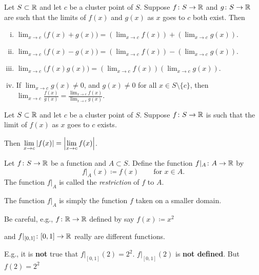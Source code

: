 \documentclass[10pt,aspectratio=169]{beamer}
\begin{document}
\begin{frame}

\begin{corollary}
Let $S \subset {\mathbb{R}}$ and let $c$ be a cluster point of $S$.  
Suppose $f \colon S \to {\mathbb{R}}$ and
$g \colon S \to {\mathbb{R}}$ are 
such that 
the limits of $f(x)$ and $g(x)$ as $x$ goes to $c$ both exist.
\pause
Then
\begin{enumerate}[(i)]
\item
$\displaystyle
\lim_{x\to c} \bigl(f(x)+g(x)\bigr) = \left(\lim_{x\to c} f(x)\right) + 
\left(\lim_{x\to c} g(x)\right) .
$
\item
\pause
$\displaystyle
\lim_{x\to c} \bigl(f(x)-g(x)\bigr) = \left(\lim_{x\to c} f(x)\right) -
\left(\lim_{x\to c} g(x)\right) .
$
\item
\pause
$\displaystyle
\lim_{x\to c} \bigl(f(x)g(x)\bigr) = \left(\lim_{x\to c} f(x)\right)
\left(\lim_{x\to c} g(x)\right) .
$
\item\pause\label{falg:cor:iv}
If
$\displaystyle \lim_{x\to c} g(x) \not= 0$,
and $g(x) \not= 0$ for all $x \in S \setminus \{ c \}$, then
$\displaystyle
\lim_{x\to c} \frac{f(x)}{g(x)} =
\frac{\lim_{x\to c} f(x)}{\lim_{x\to c} g(x)}$.
\end{enumerate}
\end{corollary}

\pause
\begin{corollary}
Let $S \subset {\mathbb{R}}$ and let $c$ be a cluster point of $S$.
Suppose $f \colon S \to {\mathbb{R}}$ is such that the limit of $f(x)$ as $x$ goes to $c$
exists.

\pause
\medskip

Then
\quad
$\displaystyle
\lim_{x\to c} \left\lvert {f(x)} \right\rvert =
\left\lvert {\lim_{x\to c} f(x)} \right\rvert$.
\end{corollary}

\end{frame}

\begin{frame}

\begin{definition}
Let $f \colon S \to {\mathbb{R}}$ be a function and $A \subset S$.  Define the
function $f|_A \colon A \to {\mathbb{R}}$ by
\begin{equation*}
f|_A (x) \coloneqq f(x)  \qquad \text{for } x \in A.
\end{equation*}
\pause
The function
$f|_A$ is called the \emph{restriction} of $f$ to $A$.
\end{definition}

\pause
The function $f|_A$ is simply the function $f$ taken on a smaller domain.

\pause
\medskip

Be careful, e.g., $f \colon {\mathbb{R}} \to {\mathbb{R}}$ defined by say $f(x) \coloneqq x^2$

and $f|_{[0,1]} \colon [0,1] \to {\mathbb{R}}$ really are different functions.

\pause
\medskip

E.g., it is \textbf{not} true that $f|_{[0,1]}(2) = 2^2$.
\quad $f|_{[0,1]}(2)$ is
\textbf{not defined}. \quad But $f(2)=2^2$

\end{frame}
\end{document}
